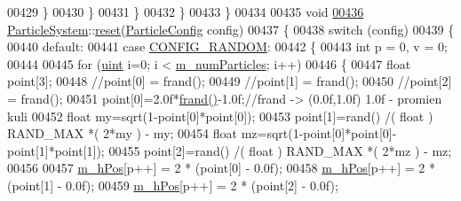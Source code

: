 \begin{DoxyCode}
{{{{{00429                 \}
00430             \}
00431         \}
00432     \}
00433 \}
00434 
00435 \textcolor{keywordtype}{void}
\hypertarget{particle_system_8cpp_source_l00436}{}\hyperlink{class_particle_system_a519070812dd9eb349f270c793c5f64b6}{00436} \hyperlink{class_particle_system}{ParticleSystem}::\hyperlink{class_particle_system_a519070812dd9eb349f270c793c5f64b6}{reset}(\hyperlink{class_particle_system_a1dca3996c8068602412ef9f7826605d1}{ParticleConfig} config)
00437 \{
00438     \textcolor{keywordflow}{switch} (config)
00439     \{
00440         \textcolor{keywordflow}{default}:
00441         \textcolor{keywordflow}{case} \hyperlink{class_particle_system_a1dca3996c8068602412ef9f7826605d1a053c69e4e6b094605ea152a644e7c9ee}{CONFIG\_RANDOM}:
00442             \{
00443                 \textcolor{keywordtype}{int} p = 0, v = 0;
00444 
00445                 \textcolor{keywordflow}{for} (\hyperlink{particles__kernel_8cuh_a91ad9478d81a7aaf2593e8d9c3d06a14}{uint} i=0; i < \hyperlink{class_particle_system_a23d238efa80a647d4b6cde034f486a91}{m\_numParticles}; i++)
00446                 \{
00447                     \textcolor{keywordtype}{float} point[3];
00448                     \textcolor{comment}{//point[0] = frand();}
00449                     \textcolor{comment}{//point[1] = frand();}
00450                     \textcolor{comment}{//point[2] = frand();}
00451                                         point[0]=2.0f*\hyperlink{particle_system_8cpp_a5459f6b6b39f9a6b80de7f17c3777ee2}{frand}\hyperlink{particle_system_8cpp_a5459f6b6b39f9a6b80de7f17c3777ee2}{(}\hyperlink{particle_system_8cpp_a5459f6b6b39f9a6b80de7f17c3777ee2}{)}-1.0f;\textcolor{comment}{//frand -> (0.0f,1.0f) 1.0f
       - promien kuli}
00452                                         \textcolor{keywordtype}{float} my=sqrt(1-point[0]*point[0]);
00453                                         point[1]=rand() /( \textcolor{keywordtype}{float} ) RAND\_MAX *( 2*my ) - my;
00454                                         \textcolor{keywordtype}{float} mz=sqrt(1-point[0]*point[0]-point[1]*point[1]);
00455                                         point[2]=rand() /( \textcolor{keywordtype}{float} ) RAND\_MAX *( 2*mz ) - mz;
00456 
00457                     \hyperlink{class_particle_system_ab9d75471d2eaaeb8fa98d2f3f47d9c25}{m\_hPos}[p++] = 2 * (point[0] - 0.0f);
00458                     \hyperlink{class_particle_system_ab9d75471d2eaaeb8fa98d2f3f47d9c25}{m\_hPos}[p++] = 2 * (point[1] - 0.0f);
00459                     \hyperlink{class_particle_system_ab9d75471d2eaaeb8fa98d2f3f47d9c25}{m\_hPos}[p++] = 2 * (point[2] - 0.0f);
}}}}}
\end{DoxyCode}
